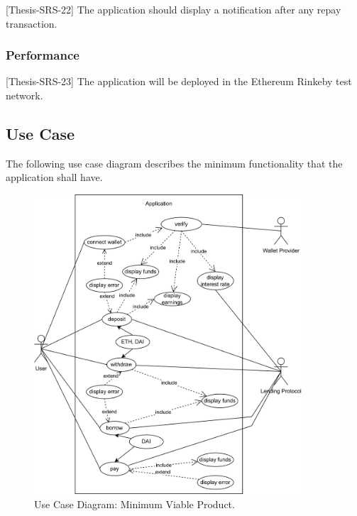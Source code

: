 \documentclass[11pt,a4paper]{report}
\begin{document}
[Thesis-SRS-22] The application should display a notification after any repay transaction.
\subsubsection{Performance}
[Thesis-SRS-23] The application will be deployed in the Ethereum Rinkeby test network.
\subsection{Use Case}
The following use case diagram describes the minimum functionality that the application shall have.
\begin{figure}[htp]
	\centering
	\includegraphics[width=0.89\textwidth]{./images/USECASE-full_nofl}
	\caption{Use Case Diagram: Minimum Viable Product.}
	\label{fig:usecase-mvp}
\end{figure}

\end{document}
